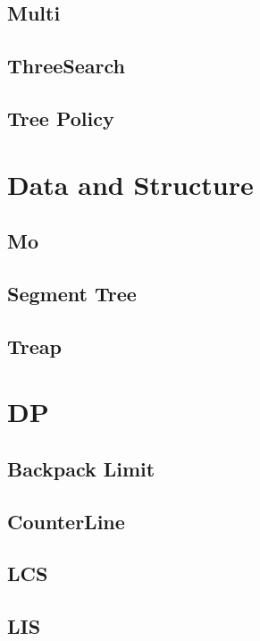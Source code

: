 \subsection{Multi}

\subsection{ThreeSearch}

\subsection{Tree Policy}



\section{Data and Structure}

\subsection{Mo}

\subsection{Segment Tree}

\subsection{Treap}


\section{DP}

\subsection{Backpack Limit}

\subsection{CounterLine}

\subsection{LCS}

\subsection{LIS}

